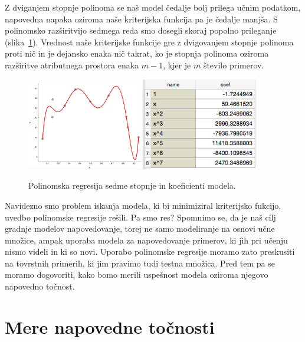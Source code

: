 Z dviganjem stopnje polinoma se naš model čedalje bolj prilega učnim podatkom, napovedna napaka oziroma naše kriterijska funkcija pa je čedalje manjša. S polinomsko razširitvijo sedmega reda smo dosegli skoraj popolno prileganje (slika~\ref{fig:poly-linear-fit7}). Vrednost naše kriterijske funkcije gre z dvigovanjem stopnje polinoma proti nič in je dejansko enaka nič takrat, ko je stopnja polinoma oziroma razširitve atributnega prostora enaka $m-1$, kjer je $m$ število primerov.

\begin{figure}[htbp]
\begin{center}
  \includegraphics[width=0.45\textwidth]{slike/poly-reg-7.png}
  \hfill
  \includegraphics[width=0.45\textwidth]{slike/poly-reg-7-coeff.png}
\caption{Polinomska regresija sedme stopnje in koeficienti modela.}
\label{fig:poly-linear-fit7}
\end{center}
\end{figure}

Navidezno smo problem iskanja modela, ki bi minimiziral kriterijsko fukcijo,  uvedbo polinomske regresije rešili. Pa smo res? Spomnimo se, da je naš cilj gradnje modelov napovedovanje, torej ne samo modeliranje na osnovi učne množice, ampak uporaba modela za napovedovanje primerov, ki jih pri učenju nismo videli in ki so novi. Uporabo polinomske regresije moramo zato preskusiti na tovrstnih primerih, ki jim pravimo tudi testna množica. Pred tem pa se moramo dogovoriti, kako bomo merili uspešnost modela oziroma njegovo napovedno točnost.

\section{Mere napovedne točnosti}

